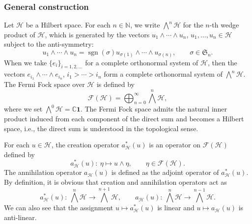 \documentclass[pdftex]{sigma}
\numberwithin{equation}{section}
\newcommand{\mfrak}[1]{\mathfrak{#1}}
\newcommand{\mcal}[1]{\mathcal{#1}}
\newcommand{\mbb}[1]{\mathbb{#1}}
\begin{document}
\subsubsection{General construction}
Let $\mcal{H}$ be a Hilbert space.
For each $n\in\mbb{N}$, we write $\bigwedge^{n}\mcal{H}$ for the $n$-th wedge product of $\mcal{H}$, which is generated by the vectors $u_{1}\wedge\cdots \wedge u_{n}$, $u_{1},\dots, u_{n}\in\mcal{H}$ subject to the anti-symmetry:
\begin{equation*}
	u_{1}\wedge\cdots \wedge u_{n}=\operatorname{sgn} (\sigma) u_{\sigma(1)}\wedge\cdots \wedge u_{\sigma (n)},\qquad \sigma\in \mfrak{S}_{n}.
\end{equation*}
When we take $\{e_{i}\}_{i=1,2,\dots}$ for a complete orthonormal system of $\mcal{H}$, then the vectors $e_{i_{1}}\wedge\cdots \wedge e_{i_{n}}$, $i_{1}>\cdots >i_{n}$ form a complete orthonormal system of $\bigwedge^{n}\mcal{H}$.
The Fermi Fock space over $\mcal{H}$ is defined by
\begin{equation*}
	\mcal{F}(\mcal{H})=\bigoplus_{n=0}^{\infty}\bigwedge^{n}\mcal{H},
\end{equation*}
where we set $\bigwedge^{0}\mcal{H}=\mbb{C}\bm{1}$.
The Fermi Fock space admits the natural inner product induced from each component of the direct sum and becomes a Hilbert space, i.e., the direct sum is understood in the topological sense.

For each $u\in \mcal{H}$, the creation operator $a_{\mcal{H}}^{\ast}(u)$ is an operator on $\mcal{F}(\mcal{H})$ defined by
\begin{equation*}
	a_{\mcal{H}}^{\ast}(u)\colon \ \eta\mapsto u\wedge \eta,\qquad \eta\in \mcal{F}(\mcal{H}).
\end{equation*}
The annihilation operator $a_{\mcal{H}}(u)$ is defined as the adjoint operator of $a_{\mcal{H}}^{\ast}(u)$.
By definition, it is obvious that creation and annihilation operators act as
\begin{equation*}
	a_{\mcal{H}}^{\ast}(u)\colon \ \bigwedge^{n}\mcal{H}\to \bigwedge^{n+1}\mcal{H},\qquad a_{\mcal{H}}(u)\colon \ \bigwedge^{n}\mcal{H}\to \bigwedge^{n-1}\mcal{H}.
\end{equation*}
We can also see that the assignment $u\mapsto a_{\mcal{H}}^{\ast}(u)$ is linear and $u\mapsto a_{\mcal{H}}(u)$ is anti-linear.
\end{document}
